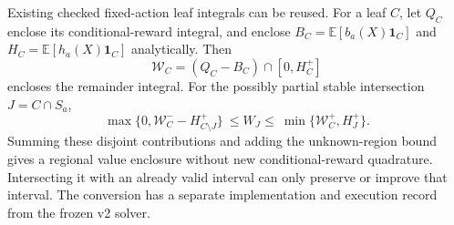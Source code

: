 Existing checked fixed-action leaf integrals can be reused. For a leaf $C$, let $Q_C$ enclose its conditional-reward integral, and enclose $B_C=\mathbb E[b_a(X)\mathbf1_C]$ and $H_C=\mathbb E[h_a(X)\mathbf1_C]$ analytically. Then
\begin{equation}
\mathcal W_C=(Q_C-B_C)\cap[0,H_C^+]
\label{eq:regional_leaf_remainder}
\end{equation}
encloses the remainder integral. For the possibly partial stable intersection $J=C\cap S_a$,
\begin{equation}
\max\{0,\mathcal W_C^- - H_{C\setminus J}^+\}
\ \le W_J\le\
\min\{\mathcal W_C^+,H_J^+\}.
\label{eq:regional_leaf_restriction}
\end{equation}
Summing these disjoint contributions and adding the unknown-region bound gives a regional value enclosure without new conditional-reward quadrature. Intersecting it with an already valid interval can only preserve or improve that interval. The conversion has a separate implementation and execution record from the frozen v2 solver.
